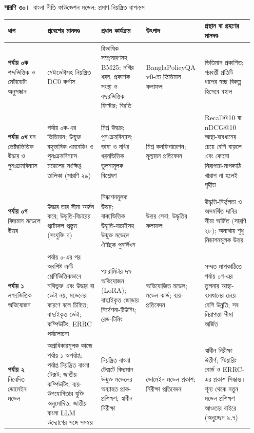 \documentclass[border=10pt]{standalone}
\begin{document}
\begin{minipage}{17cm}
{\large\bfseries সারণি ৩০।}\ {\large বাংলা নীতি ফাউন্ডেশন মডেল: প্রমাণ-নিয়ন্ত্রিত ধাপক্রম}\par\vspace{7pt}
\small
{}
\begin{tabularx}{\linewidth}{@{}>{\hsize=0.619\hsize\raggedright\arraybackslash}X>{\hsize=1.143\hsize\raggedright\arraybackslash}X>{\hsize=1.190\hsize\raggedright\arraybackslash}X>{\hsize=0.810\hsize\raggedright\arraybackslash}X>{\hsize=1.238\hsize\raggedright\arraybackslash}X@{}}
\arrayrulecolor{bapilrule}\toprule
\rowcolor{white}\textbf{ধাপ} & \textbf{প্রবেশের মানদণ্ড} & \textbf{প্রধান কার্যক্রম} & \textbf{উৎপাদ} & \textbf{প্রস্থান বা গ্রহণের মানদণ্ড} \\
\midrule
\textbf{পর্যায় ০ক} শব্দভিত্তিক ও মেটাডেটা অনুসন্ধান & মেটাডেটাসহ নিয়ন্ত্রিত DC0 কর্পাস & দ্বিভাষিক সম্প্রসারণসহ BM25; নথির ধরন, প্রকাশক সংস্থা ও বছরভিত্তিক ফিল্টার; বিরতি & BanglaPolicyQA v0-তে ভিত্তিমান ফলাফল & ভিত্তিমান প্রকাশিত; পরবর্তী প্রতিটি ধাপের স্বচ্ছ বিকল্প হিসেবে বহাল \\
\textbf{পর্যায় ০খ} ঘন ভেক্টরভিত্তিক উদ্ধার ও পুনঃক্রমবিন্যাস & পর্যায় ০ক-এর ভিত্তিমান; উন্মুক্ত বহুভাষিক এমবেডিং ও পুনঃক্রমবিন্যাস মডেলের সংক্ষিপ্ত তালিকা (সারণি ২৯) & মিশ্র উদ্ধার; পুনঃক্রমবিন্যাস; ভাষা ও নথির ধরনভিত্তিক তুলনামূলক বিশ্লেষণ & মিশ্র কনফিগারেশন; মূল্যায়ন প্রতিবেদন & Recall@10 বা nDCG@10 আস্থা-ব্যবধানের চেয়ে বেশি বাড়লে এবং কোনো নিরাপত্তা-মাপকাঠি খারাপ না হলেই গৃহীত \\
\textbf{পর্যায় ০গ} বিদ্যমান মডেলে উত্তর & উদ্ধার তার সীমা অর্জন করে; উদ্ধৃতি-বিচারের প্রটোকল প্রস্তুত (সংযুক্তি দ) & নিষ্কাশনমূলক উত্তর; বাক্যভিত্তিক উদ্ধৃতি-যাচাইসহ উন্মুক্ত মডেলে ঐচ্ছিক পুনর্লিখন & উত্তর সেবা; উদ্ধৃতির ফলাফল & উদ্ধৃতি-নির্ভুলতা ও অসমর্থিত দাবির সীমা অর্জিত (সারণি ২৮); অন্যথায় শুধু নিষ্কাশনমূলক উত্তর \\
\textbf{পর্যায় ১} লক্ষ্যভিত্তিক অভিযোজন & পর্যায় ০-এর পর অবশিষ্ট ত্রুটি শ্রেণিভিত্তিকভাবে নথিভুক্ত এবং উদ্ধার বা ডেটা নয়, মডেলের কারণে বলে চিহ্নিত; বাছাইকৃত ডেটা; কম্পিউটিং; ERRC পর্যালোচনা & প্যারামিটার-দক্ষ অভিযোজন (LoRA); বাছাইকৃত জোড়ায় নির্দেশনা-টিউনিং; রেড-টিমিং & অভিযোজিত মডেল; মডেল কার্ড; ব্যয়-প্রতিবেদন & সম্মত মাপকাঠিতে পর্যায় ০গ-এর তুলনায় আস্থা-ব্যবধানের চেয়ে বেশি উন্নতি; সব নিরাপত্তা-সীমা অর্জিত \\
\textbf{পর্যায় ২} নিবেদিত ডোমেইন মডেল & অগ্রাধিকারমূলক কাজে পর্যায় ১ অপর্যাপ্ত; পর্যাপ্ত নিয়ন্ত্রিত বাংলা টেক্সট; জাতীয় কম্পিউটিং; ব্যয়-উপযোগিতার যুক্তি অনুমোদিত; জাতীয় বাংলা LLM উদ্যোগের সঙ্গে সমন্বয় & নিয়ন্ত্রিত বাংলা টেক্সটে বিদ্যমান উন্মুক্ত মডেলের অব্যাহত প্রাক-প্রশিক্ষণ; স্বাধীন নিরীক্ষা & ডোমেইন মডেল প্রকাশ; নিরীক্ষা প্রতিবেদন & স্বাধীন নিরীক্ষা উত্তীর্ণ; স্টিয়ারিং বোর্ড ও ERRC-এর প্রকাশ-সিদ্ধান্ত। শূন্য থেকে নতুন মডেল প্রশিক্ষণ আওতার বাইরে (অনুচ্ছেদ ৯.৭) \\
\bottomrule
\end{tabularx}
\par{}
\end{minipage}
\end{document}
